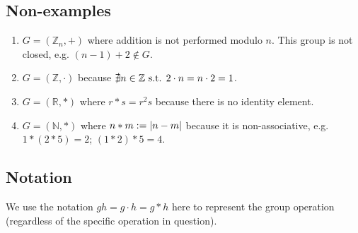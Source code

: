 \subsection{Non-examples}
\begin{enumerate}
	\item \(G = (\mathbb Z_n, +)\) where addition is not performed modulo \(n\).
	      This group is not closed, e.g.
	      \((n-1) + 2 \notin G\).
	\item \(G = (\mathbb Z, \cdot)\) because \(\nexists n\in \mathbb Z \text{ s.t. } 2 \cdot n = n \cdot 2 = 1\).
	\item \(G = (\mathbb R, \ast)\) where \(r \ast s = r^2 s\) because there is no identity element.
	\item \(G = (\mathbb N, \ast)\) where \(n \ast m := \abs{n - m}\) because it is non-associative, e.g.
	      \(1 \ast (2 \ast 5) = 2\); \((1 \ast 2) \ast 5 = 4\).
\end{enumerate}

\subsection{Notation}
We use the notation \(gh=g\cdot h = g \ast h\) here to represent the group operation (regardless of the specific operation in question).
